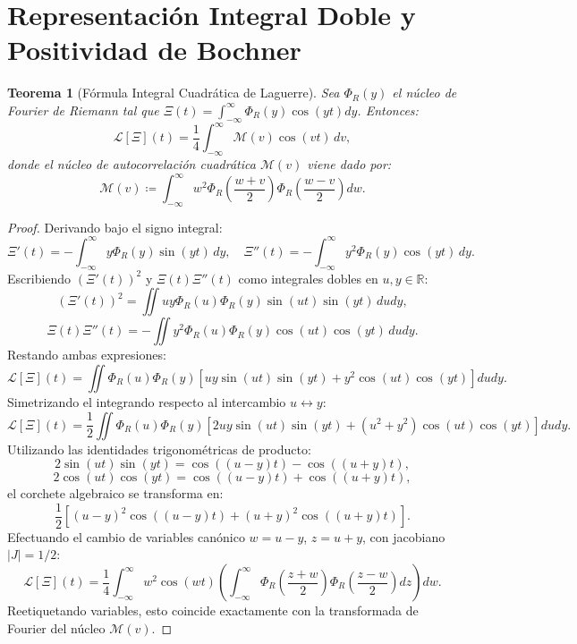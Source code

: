 \documentclass[11pt,a4paper]{article}
\newtheorem{theorem}{Teorema}[section]
\theoremstyle{definition}
\theoremstyle{remark}
\begin{document}
\section{Representación Integral Doble y Positividad de Bochner}

\begin{theorem}[Fórmula Integral Cuadrática de Laguerre]
Sea $\Phi_R(y)$ el núcleo de Fourier de Riemann tal que $\Xi(t) = \int_{-\infty}^\infty \Phi_R(y) \cos(yt) dy$. Entonces:
\begin{equation}
\mathcal{L}[\Xi](t) = \frac{1}{4}\int_{-\infty}^\infty \mathcal{M}(v) \cos(vt)\, dv,
\end{equation}
donde el núcleo de autocorrelación cuadrática $\mathcal{M}(v)$ viene dado por:
\begin{equation}
\mathcal{M}(v) \coloneqq \int_{-\infty}^\infty w^2 \Phi_R\left(\frac{w+v}{2}\right) \Phi_R\left(\frac{w-v}{2}\right) dw.
\end{equation}
\end{theorem}

\begin{proof}
Derivando bajo el signo integral:
\[
\Xi'(t) = -\int_{-\infty}^\infty y \Phi_R(y) \sin(yt)\, dy, \quad \Xi''(t) = -\int_{-\infty}^\infty y^2 \Phi_R(y) \cos(yt)\, dy.
\]
Escribiendo $(\Xi'(t))^2$ y $\Xi(t)\Xi''(t)$ como integrales dobles en $u, y \in \mathbb{R}$:
\[
(\Xi'(t))^2 = \iint u y \Phi_R(u)\Phi_R(y) \sin(ut)\sin(yt)\, du dy,
\]
\[
\Xi(t)\Xi''(t) = -\iint y^2 \Phi_R(u)\Phi_R(y) \cos(ut)\cos(yt)\, du dy.
\]
Restando ambas expresiones:
\[
\mathcal{L}[\Xi](t) = \iint \Phi_R(u)\Phi_R(y) \left[ u y \sin(ut)\sin(yt) + y^2 \cos(ut)\cos(yt) \right] du dy.
\]
Simetrizando el integrando respecto al intercambio $u \leftrightarrow y$:
\[
\mathcal{L}[\Xi](t) = \frac{1}{2} \iint \Phi_R(u)\Phi_R(y) \left[ 2 u y \sin(ut)\sin(yt) + (u^2 + y^2) \cos(ut)\cos(yt) \right] du dy.
\]
Utilizando las identidades trigonométricas de producto:
\[
2\sin(ut)\sin(yt) = \cos((u-y)t) - \cos((u+y)t),
\]
\[
2\cos(ut)\cos(yt) = \cos((u-y)t) + \cos((u+y)t),
\]
el corchete algebraico se transforma en:
\[
\frac{1}{2} \left[ (u - y)^2 \cos((u-y)t) + (u + y)^2 \cos((u+y)t) \right].
\]
Efectuando el cambio de variables canónico $w = u - y$, $z = u + y$, con jacobiano $|J| = 1/2$:
\[
\mathcal{L}[\Xi](t) = \frac{1}{4} \int_{-\infty}^\infty w^2 \cos(wt) \left( \int_{-\infty}^\infty \Phi_R\left(\frac{z+w}{2}\right) \Phi_R\left(\frac{z-w}{2}\right) dz \right) dw.
\]
Reetiquetando variables, esto coincide exactamente con la transformada de Fourier del núcleo $\mathcal{M}(v)$.
\end{proof}
\end{document}
